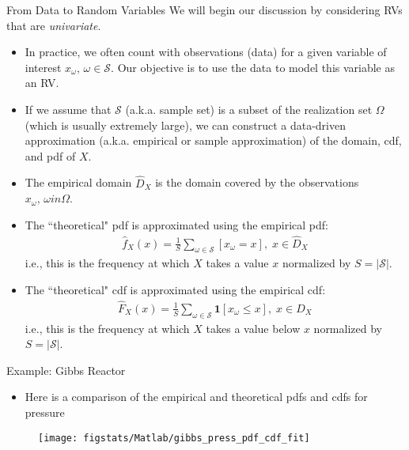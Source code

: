 \documentclass[9pt]{beamer}
\begin{document}
\begin{frame}{From Data to Random Variables}
We will begin our discussion by considering RVs that are {\em univariate}.
\begin{block}{}
\begin{itemize}
\item In practice, we often count with observations (data) for a given variable of interest $x_\omega,\, \omega \in \mathcal{S}$. Our objective is to use the data to model this variable as an RV. 
\item If we assume that $\mathcal{S}$ (a.k.a. sample set) is a subset of the realization set $\Omega$ (which is usually extremely large), we can construct a data-driven approximation (a.k.a. empirical or sample approximation) of the domain, cdf, and pdf of $X$.
\item The empirical domain $\hat{D}_X$ is the domain covered by the observations $x_\omega,\, \omega in \Omega$.
\item The ``theoretical" pdf is approximated using the empirical pdf: 
\begin{align*}
\hat{f}_X(x)=\frac{1}{S}\sum_{\omega \in \mathcal{S}}[x_\omega= x],\; x\in \hat{D}_X
\end{align*}
i.e., this is the frequency at which $X$ takes a value $x$ normalized by $S=|\mathcal{S}|$. 
\item The ``theoretical" cdf is approximated using the empirical cdf:
\begin{align*}
\hat{F}_X(x)=\frac{1}{S}\sum_{\omega \in \mathcal{S}}\mathbf{1}[x_\omega\leq x],\; x\in \hat{D}_X
\end{align*}
i.e., this is the frequency at which $X$ takes a value below $x$ normalized by $S=|\mathcal{S}|$. 
\end{itemize}
\end{block}
\end{frame}

\begin{frame}{Example: Gibbs Reactor}

\begin{itemize}
\item Here is a comparison of the empirical and theoretical pdfs and cdfs for pressure
\end{itemize}
\begin{figure}[!htb]
    \centering
	\texttt{[image: figstats/Matlab/gibbs\_press\_pdf\_cdf\_fit]}
\end{figure}

\end{frame}
\end{document}
